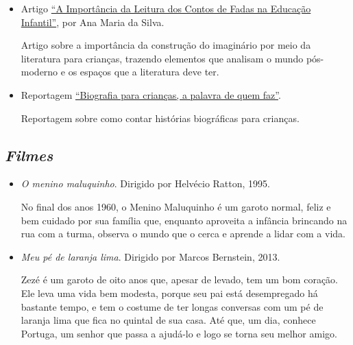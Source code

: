 \documentclass[11pt]{extarticle}
\begin{document}
\begin{itemize}
\item Artigo \href{https://siteantigo.portaleducacao.com.br/conteudo/artigos/educacao/a-importancia-da-leitura-dos-contos-de-fadas-na-educacao-infantil/30151}{``A Importância da Leitura dos Contos de Fadas na Educação Infantil''}, por Ana Maria da Silva.

Artigo sobre a importância da construção do imaginário por meio da literatura para crianças, trazendo elementos que analisam o mundo pós-moderno e os espaços que a literatura deve ter.

\item Reportagem \href{http://www.multirio.rj.gov.br/index.php/leia/reportagens-artigos/reportagens/3059-biografias-para-criancas-a-palavra-de-quem-faz}{``Biografia para crianças, a palavra de quem faz''}.

Reportagem sobre como contar histórias biográficas para crianças.

\end{itemize}

\subsection{\textit{Filmes}}

\begin{itemize}
\item \textit{O menino maluquinho}. Dirigido por Helvécio Ratton, 1995.

No final dos anos 1960, o Menino Maluquinho é um garoto normal, feliz e bem cuidado por sua família que, enquanto aproveita a infância brincando na rua com a turma, observa o mundo que o cerca e aprende a lidar com a vida.

\item \textit{Meu pé de laranja lima}. Dirigido por Marcos Bernstein, 2013.

Zezé é um garoto de oito anos que, apesar de levado, tem um bom coração. Ele leva uma vida bem modesta, porque seu pai está desempregado há bastante tempo, e tem o costume de ter longas conversas com um pé de laranja lima que fica no quintal de sua casa. Até que, um dia, conhece Portuga, um senhor que passa a ajudá-lo e logo se torna seu melhor amigo.


\end{itemize}
\end{document}
